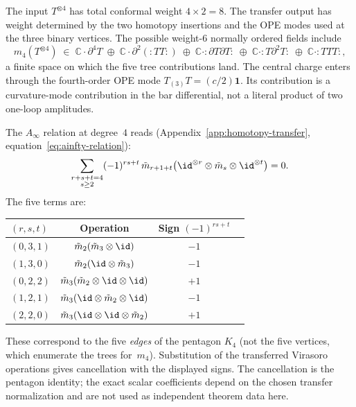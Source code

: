\begin{computation}
The input $T^{\otimes 4}$ has total conformal weight $4 \times 2 = 8$.
The transfer output has weight determined by the two homotopy
insertions and the OPE modes used at the three binary vertices.  The
possible weight-$6$ normally ordered fields include
\begin{equation}\label{eq:m4-weight-analysis}
m_4(T^{\otimes 4}) \;\in\; \mathbb{C}\cdot\partial^4 T \;\oplus\;
\mathbb{C}\cdot \partial^2({:}TT{:}) \;\oplus\;
\mathbb{C}\cdot {:}\partial T \partial T{:} \;\oplus\;
\mathbb{C}\cdot {:}T\partial^2 T{:} \;\oplus\;
\mathbb{C}\cdot {:}TTT{:},
\end{equation}
a finite space on which the five tree contributions land.  The central
charge enters through the fourth-order OPE mode
$T_{(3)}T=(c/2)\mathbf{1}$.  Its contribution is a curvature-mode
contribution in the bar differential, not a literal product of two
one-loop amplitudes.

The $A_\infty$ relation at degree~$4$ reads
(Appendix~\ref{app:homotopy-transfer},
equation~\eqref{eq:ainfty-relation}):
\begin{equation}\label{eq:pentagon-ainfty}
\sum_{\substack{r+s+t = 4 \\ s \geq 2}} (-1)^{rs+t}\,
\tilde{m}_{r+1+t}\bigl(\id^{\otimes r} \otimes \tilde{m}_s
\otimes \id^{\otimes t}\bigr) = 0.
\end{equation}
The five terms are:
\begin{center}
\renewcommand{\arraystretch}{1.2}
\begin{tabular}{lccc}
\toprule
$(r,s,t)$ & Operation & Sign $(-1)^{rs+t}$ \\
\midrule
$(0,3,1)$ & $\tilde{m}_2(\tilde{m}_3 \otimes \id)$ & $-1$ \\
$(1,3,0)$ & $\tilde{m}_2(\id \otimes \tilde{m}_3)$ & $-1$ \\
$(0,2,2)$ & $\tilde{m}_3(\tilde{m}_2 \otimes \id \otimes \id)$ & $+1$ \\
$(1,2,1)$ & $\tilde{m}_3(\id \otimes \tilde{m}_2 \otimes \id)$ & $-1$ \\
$(2,2,0)$ & $\tilde{m}_3(\id \otimes \id \otimes \tilde{m}_2)$ & $+1$ \\
\bottomrule
\end{tabular}
\end{center}

These correspond to the five \emph{edges} of the pentagon $K_4$
(not the five vertices, which enumerate the trees for~$m_4$).
Substitution of the transferred Virasoro operations gives cancellation
with the displayed signs.  The cancellation is the pentagon identity;
the exact scalar coefficients depend on the chosen transfer
normalization and are not used as independent theorem data here.
\end{computation}

